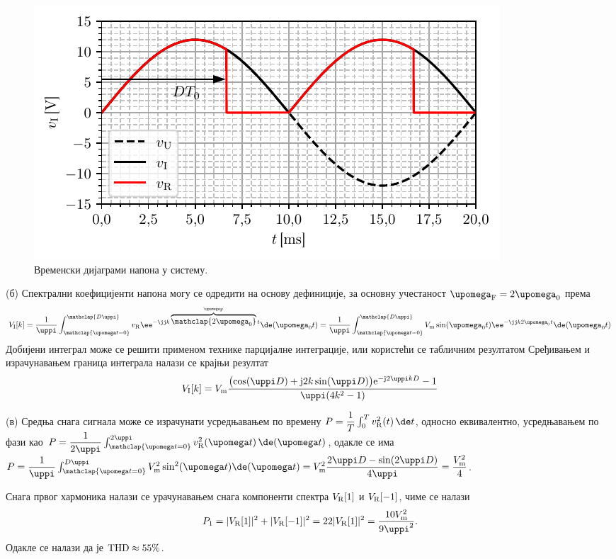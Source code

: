 \begin{figure}[ht!]
    \centering
    \includegraphics{fig/THD_vi_vr.pdf}
    \caption{Временски дијаграми напона у систему.}
    \label{fig:\ID.vivr}
\end{figure}

(б) Спектрални коефицијенти напона могу се одредити на основу дефиниције, за основну учестаност 
$\upomega_{\rm F} = 2\upomega_0$ према 
\begin{equation}
    V_{\rm I}[k] = \dfrac{1}{\uppi} \int_{\mathclap{\upomega t = 0}}^{\mathclap{D\uppi}} v_{\rm R} \ee^{-\jj k \overbrace{\mathclap{2\upomega_{\rm 0}}}^{\upomega_{\rm F}} t} \de(\upomega_0 t) 
    = \dfrac{1}{\uppi} \int_{\mathclap{\upomega t = 0}}^{\mathclap{D\uppi}} V_{\rm m} \sin(\upomega_0 t) \ee^{-\jj k {2\upomega_{\rm 0} } t} \de(\upomega_0 t) 
\end{equation}
Добијени интеграл може се решити применом технике парцијалне интеграције, или користећи се табличним резултатом 
Сређивањем и израчунавањем граница интеграла
налази се крајњи резултат
\begin{equation}
V_{\rm I}[k] = {V_{\rm m}}
\dfrac{
\bigl(
\cos(\uppi D) + 
{\rm j}2k \sin(\uppi D) 
\bigr)
{\rm e}^{-{\rm j}2\uppi kD }
-1 }{\uppi(4k^2 - 1)}
\end{equation}


(в) Средња снага сигнала може се израчунати усредњавањем по времену
$P = \dfrac{1}{T} \int_0^T v_{\rm R}^2(t) \, \de t$, односно еквивалентно, 
усредњавањем по фази као 
$P = \dfrac{1}{2\uppi} \int_{\mathclap{\upomega t = 0}}^{2\uppi} v_{\rm R}^2(\upomega t) \, \de(\upomega t)$, одакле се 
има 
$P = \dfrac{1}{\uppi} \int_{\mathclap{\upomega t = 0}}^{D\uppi} V_{\rm m}^2 \sin^2(\upomega t) \de (\upomega t) 
   = V_{\rm m}^2 \dfrac{2\uppi D - \sin(2\uppi D)}{4\uppi} = \dfrac{V_{\rm m}^2}{4}$.

Снага првог хармоника налази се урачунавањем снага компоненти спектра $V_{\rm R}[1]$ и $V_{\rm R}[-1]$, чиме се налази
\begin{equation}
    P_1 = |V_{\rm R}[1]|^2 + |V_{\rm R}[-1]|^2 = 2 2 |V_{\rm R}[1]|^2 
    = \dfrac{10 V_{\rm m}^2}{9\uppi^2}.
\end{equation}
Одакле се налази да је $\rm THD \approx 55\%$.